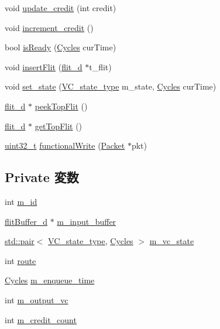 \begin{DoxyCompactItemize}
\item 
void \hyperlink{classVirtualChannel__d_a158140800f6b905b9e00fe78ad2697f0}{update\_\-credit} (int credit)
\item 
void \hyperlink{classVirtualChannel__d_a172163c0eb1a059fb22ead59c4e29d86}{increment\_\-credit} ()
\item 
bool \hyperlink{classVirtualChannel__d_ae19b07af91a49435139ba13f5665b239}{isReady} (\hyperlink{classCycles}{Cycles} curTime)
\item 
void \hyperlink{classVirtualChannel__d_a67ce8a357ade6711b2164ca4d96a7590}{insertFlit} (\hyperlink{classflit__d}{flit\_\-d} $\ast$t\_\-flit)
\item 
void \hyperlink{classVirtualChannel__d_a5447f3c4494e31e226d203d3e4e822df}{set\_\-state} (\hyperlink{NetworkHeader_8hh_aaafaa208359111dcd9f4d47ff377da76}{VC\_\-state\_\-type} m\_\-state, \hyperlink{classCycles}{Cycles} curTime)
\item 
\hyperlink{classflit__d}{flit\_\-d} $\ast$ \hyperlink{classVirtualChannel__d_ad04b660f0ff7b0e397beb261633f8b4e}{peekTopFlit} ()
\item 
\hyperlink{classflit__d}{flit\_\-d} $\ast$ \hyperlink{classVirtualChannel__d_a5b9261af9ccdd053e2311fb749c88fa6}{getTopFlit} ()
\item 
\hyperlink{Type_8hh_a435d1572bf3f880d55459d9805097f62}{uint32\_\-t} \hyperlink{classVirtualChannel__d_ad07b9def1d6f5e5f988a254c3a9d1ad9}{functionalWrite} (\hyperlink{classPacket}{Packet} $\ast$pkt)
\end{DoxyCompactItemize}
\subsection*{Private 変数}
\begin{DoxyCompactItemize}
\item 
int \hyperlink{classVirtualChannel__d_aad966617e7e050bedbead762727808a5}{m\_\-id}
\item 
\hyperlink{classflitBuffer__d}{flitBuffer\_\-d} $\ast$ \hyperlink{classVirtualChannel__d_aa9a1d8ba034016971170582d929d4799}{m\_\-input\_\-buffer}
\item 
\hyperlink{classstd_1_1pair}{std::pair}$<$ \hyperlink{NetworkHeader_8hh_aaafaa208359111dcd9f4d47ff377da76}{VC\_\-state\_\-type}, \hyperlink{classCycles}{Cycles} $>$ \hyperlink{classVirtualChannel__d_aca692908703dd8937812aeb855ecece3}{m\_\-vc\_\-state}
\item 
int \hyperlink{classVirtualChannel__d_a882872953fb42de6e7f35d22d1b9e3e1}{route}
\item 
\hyperlink{classCycles}{Cycles} \hyperlink{classVirtualChannel__d_a09c7a74d0bb6e5b6d02f0ae0f3fc9264}{m\_\-enqueue\_\-time}
\item 
int \hyperlink{classVirtualChannel__d_a8ed6a5033ed26f0b6181539a86ae153b}{m\_\-output\_\-vc}
\item 
int \hyperlink{classVirtualChannel__d_aa125042f401c86607d5ae44935b68631}{m\_\-credit\_\-count}
\end{DoxyCompactItemize}


